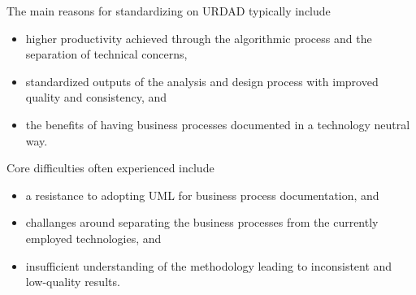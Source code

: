 The main reasons for standardizing on URDAD typically include
\begin{itemize}
  \item higher productivity achieved through the algorithmic process and the separation of technical concerns,
  \item standardized outputs of the analysis and design process with improved quality and consistency, and
  \item the benefits of having business processes documented in a technology neutral way.
\end{itemize}

Core difficulties often experienced include
\begin{itemize}
  \item a resistance to adopting UML for business process documentation, and
  \item challanges around separating the business processes from the currently employed technologies, and
  \item insufficient understanding of the methodology leading to inconsistent and low-quality results.
\end{itemize}

